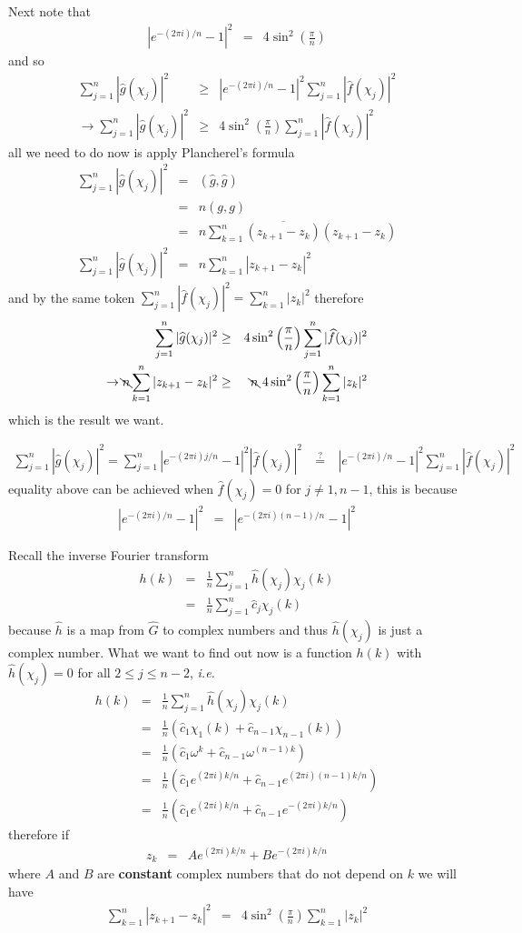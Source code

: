 \documentclass[aps,preprint,preprintnumbers,nofootinbib,showpacs,prd]{revtex4-1}
\newcommand{\ie}{{\it i.e.} }
\newcommand{\nbea}{\begin{eqnarray*}}
\newcommand{\neea}{\end{eqnarray*}}
\begin{document}
Next note that
%
\nbea
|e^{-(2\pi i)/n}-1|^2 & = & 4\sin^2\left(\frac{\pi}{n}\right)
\neea
%
and so
%
\nbea
\sum_{j=1}^{n}|\widehat g(\chi_j)|^2 & \ge & |e^{-(2\pi i)/n}-1|^2 \sum_{j=1}^{n} |\widehat f(\chi_j)|^2 \\
\to \sum_{j=1}^{n}|\widehat g(\chi_j)|^2 & \ge & 4\sin^2\left(\frac{\pi}{n}\right) \sum_{j=1}^{n} |\widehat f(\chi_j)|^2
\neea
%
all we need to do now is apply Plancherel's formula
%
\nbea
\sum_{j=1}^{n}|\widehat g(\chi_j)|^2 & = & (\widehat g,\widehat g) \\
& = & n (g,g) \\
& = & n \sum_{k=1}^n \overline{(z_{k+1} - z_k)}(z_{k+1} - z_k) \\
\sum_{j=1}^{n}|\widehat g(\chi_j)|^2 & = & n \sum_{k=1}^n |z_{k+1} - z_k|^2
\neea
%
and by the same token $\sum_{j=1}^{n}|\widehat f(\chi_j)|^2 = \sum_{k=1}^n|z_k|^2$ therefore
%
\nbea
\sum_{j=1}^{n}|\widehat g(\chi_j)|^2 & \ge & 4\sin^2\left(\frac{\pi}{n}\right) \sum_{j=1}^{n} |\widehat f(\chi_j)|^2 \\
\to \bcancel{n} \sum_{k=1}^n |z_{k+1} - z_k|^2 & \ge & \bcancel{n}~4\sin^2\left(\frac{\pi}{n}\right) \sum_{k=1}^n|z_k|^2
\neea
%
which is the result we want.

%
\nbea
\sum_{j=1}^n |\widehat g(\chi_j)|^2 = \sum_{j=1}^{n} |e^{-(2\pi i)j/n}-1|^2|\widehat f(\chi_j)|^2 & ~\stackrel{?}{=}~ & |e^{-(2\pi i)/n}-1|^2 \sum_{j=1}^{n} |\widehat f(\chi_j)|^2
\neea
%
equality above can be achieved when $\widehat f(\chi_j) = 0$ for $j\neq 1,n-1$, this is because
%
\nbea
|e^{-(2\pi i)/n}-1|^2 & = & |e^{-(2\pi i)(n-1)/n}-1|^2
\neea
%

Recall the inverse Fourier transform
%
\nbea
h(k) & = & \frac{1}{n} \sum_{j=1}^n \widehat h(\chi_j)\chi_j(k) \\
& = & \frac{1}{n} \sum_{j=1}^n \widehat c_j \chi_j(k)
\neea
%
because $\widehat h$ is a map from $\widehat G$ to complex numbers and thus $\widehat h (\chi_j)$ is just a complex number. What we want to find out now is a function $h(k)$ with $\widehat h(\chi_j) = 0$ for all $2 \le j \le n-2 $, \ie
%
\nbea
h(k) & = & \frac{1}{n} \sum_{j=1}^n \widehat h(\chi_j)\chi_j(k) \\
& = & \frac{1}{n} \left ( \widehat c_1 \chi_1(k) + \widehat c_{n-1} \chi_{n-1}(k) \right ) \\
& = & \frac{1}{n} \left ( \widehat c_1 \omega^{k} + \widehat c_{n-1} \omega^{(n-1)k} \right ) \\
& = & \frac{1}{n} \left ( \widehat c_1 e^{(2\pi i)k/n} + \widehat c_{n-1} e^{(2\pi i)(n-1)k/n} \right ) \\
& = & \frac{1}{n} \left ( \widehat c_1 e^{(2\pi i)k/n} + \widehat c_{n-1} e^{-(2\pi i)k/n} \right )
\neea
%
therefore if
%
\nbea
z_k & = & A e^{(2\pi i)k/n} + B e^{-(2\pi i)k/n}
\neea
%
where $A$ and $B$ are {\bf constant} complex numbers that do not depend on $k$ we will have
%
\nbea
\sum_{k=1}^n |z_{k+1} - z_k|^2 & = & 4\sin^2\left(\frac{\pi}{n}\right) \sum_{k=1}^n|z_k|^2
\neea
%
\end{document}
